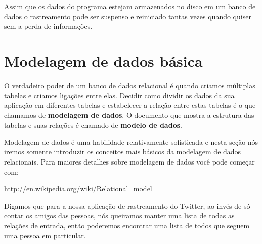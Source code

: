 Assim que os dados do programa estejam armazenados no disco em um banco de
dados o rastreamento pode ser suspenso e reiniciado tantas vezes quando
quiser sem a perda de informações.

\section{Modelagem de dados básica}


O verdadeiro poder de um banco de dados relacional é quando criamos múltiplas
tabelas e criamos ligações entre elas. Decidir como dividir os dados da sua
aplicação em diferentes tabelas e estabelecer a relação entre estas tabelas é
o que chamamos de {\bf modelagem de dados}. O documento que mostra a estrutura 
das tabelas e suas relações é chamado de {\bf modelo de dados}.


Modelagem de dados é uma habilidade relativamente sofisticada e nesta seção
nós iremos somente introduzir os conceitos mais básicos da modelagem de dados
relacionais. Para maiores detalhes sobre modelagem de dados você pode começar
com:

\url{http://en.wikipedia.org/wiki/Relational_model}


Digamos que para a nossa aplicação de rastreamento do Twitter, ao invés de
só contar os amigos das pessoas, nós queiramos manter uma lista de todas as
relações de entrada, então poderemos encontrar uma lista de todos que seguem
uma pessoa em particular.

